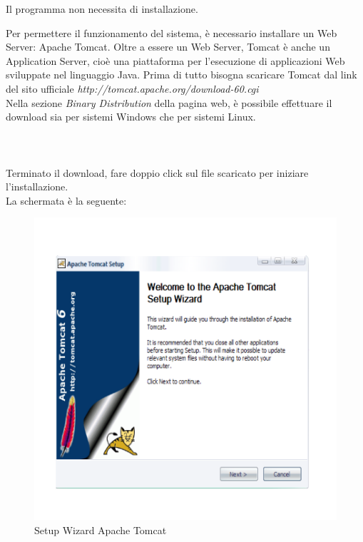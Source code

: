 
Il programma non necessita di installazione. 

Per permettere il funzionamento del sistema, \`e necessario installare un Web Server: Apache Tomcat. Oltre a essere un Web Server, Tomcat \`e anche un
Application Server, cio\`e una piattaforma per l'esecuzione di applicazioni Web sviluppate nel linguaggio Java.
Prima di tutto bisogna scaricare Tomcat dal link del sito ufficiale \textit{http://tomcat.apache.org/download-60.cgi}\\
Nella sezione \textit{Binary Distribution} della pagina web, \`e possibile effettuare il download sia per sistemi Windows che per sistemi Linux.\\
\\
\\
\\
Terminato il download, fare doppio click sul file scaricato per iniziare l'installazione.\\
La schermata \`e la seguente:

\begin{figure}[!ht]
\centering
\includegraphics[scale=0.7]{images/InstallTomcat1.png}
\caption{Setup Wizard Apache Tomcat}
\end{figure} 

